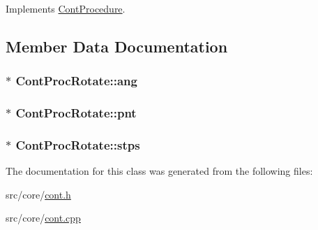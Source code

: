 Implements \hyperlink{a00067_a7f7adefe250a00b3778669ef649f03ac}{Cont\-Procedure}.



\subsection{Member Data Documentation}
\hypertarget{a00081_af8b0975b0e13c22fbbe83ac5ea88428d}{
\subsubsection[{ang}]{$\ast$ Cont\-Proc\-Rotate\-::ang\hspace{0.3cm}{\ttfamily [private]}}}\label{a00081_af8b0975b0e13c22fbbe83ac5ea88428d}
\hypertarget{a00081_a8765065ec0653f1b66bcec6ee9e116fe}{
\subsubsection[{pnt}]{$\ast$ Cont\-Proc\-Rotate\-::pnt\hspace{0.3cm}{\ttfamily [private]}}}\label{a00081_a8765065ec0653f1b66bcec6ee9e116fe}
\hypertarget{a00081_a5e6ce0fd72cfd4220a4a501774a8226d}{
\subsubsection[{stps}]{ $\ast$ Cont\-Proc\-Rotate\-::stps\hspace{0.3cm}{\ttfamily [private]}}}\label{a00081_a5e6ce0fd72cfd4220a4a501774a8226d}


The documentation for this class was generated from the following files\-:\begin{DoxyCompactItemize}
\item 
src/core/\hyperlink{a00218}{cont.\-h}\item 
src/core/\hyperlink{a00217}{cont.\-cpp}\end{DoxyCompactItemize}

